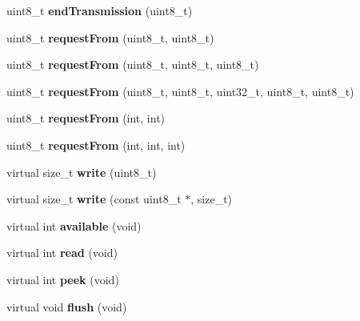 \begin{DoxyCompactItemize}
uint8\+\_\+t {\bfseries end\+Transmission} (uint8\+\_\+t)
\item 
\mbox{\label{class_two_wire_ae27d0936487551a05a1e9901bc456599}} 
uint8\+\_\+t {\bfseries request\+From} (uint8\+\_\+t, uint8\+\_\+t)
\item 
\mbox{\label{class_two_wire_a4b4b618531a04d5488a52583a3dfb173}} 
uint8\+\_\+t {\bfseries request\+From} (uint8\+\_\+t, uint8\+\_\+t, uint8\+\_\+t)
\item 
\mbox{\label{class_two_wire_acd59cc9570fd49b1cf9044cbefef85ac}} 
uint8\+\_\+t {\bfseries request\+From} (uint8\+\_\+t, uint8\+\_\+t, uint32\+\_\+t, uint8\+\_\+t, uint8\+\_\+t)
\item 
\mbox{\label{class_two_wire_ad40a27213d0bb32f7b819aa8962fccd3}} 
uint8\+\_\+t {\bfseries request\+From} (int, int)
\item 
\mbox{\label{class_two_wire_a3d76da36fb8571e0b5e8310e9f86f6fe}} 
uint8\+\_\+t {\bfseries request\+From} (int, int, int)
\item 
\mbox{\label{class_two_wire_a6850a6e981a687cc57791670121664cb}} 
virtual size\+\_\+t {\bfseries write} (uint8\+\_\+t)
\item 
\mbox{\label{class_two_wire_aae4d6ff65d9d4953e40ebeeccd908615}} 
virtual size\+\_\+t {\bfseries write} (const uint8\+\_\+t $\ast$, size\+\_\+t)
\item 
\mbox{\label{class_two_wire_a2fa9c43179d08d953f199fe82d0536d9}} 
virtual int {\bfseries available} (void)
\item 
\mbox{\label{class_two_wire_a7769632871ef9bbe8c0850a8ff8a0b5f}} 
virtual int {\bfseries read} (void)
\item 
\mbox{\label{class_two_wire_ac347efa8f804b718763fdbaae53c406d}} 
virtual int {\bfseries peek} (void)
\item 
\mbox{\label{class_two_wire_ae293e7890d18eb2d47e80482033d9e77}} 
virtual void {\bfseries flush} (void)

\end{DoxyCompactItemize}

